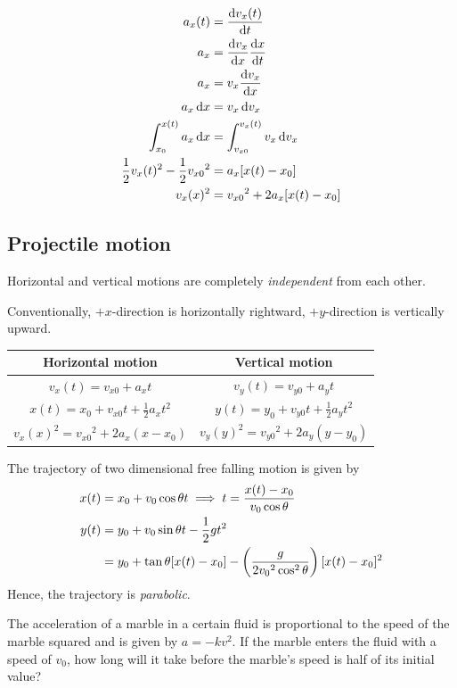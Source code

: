\begin{derivation}
\begin{align*}
a_x(t) &= \odv{v_x(t)}{t} \\
a_x &= \odv{v_x}{x} \odv{x}{t} \\
a_x &= v_x \odv{v_x}{x} \\
a_x \dd{x} &= v_x \dd{v_x} \\
\int_{x_0}^{x(t)}a_x\dd{x} &= \int_{v_{x0}}^{v_x(t)}v_x \dd{v_x} \\
\frac{1}{2}v_x(t)^2 - \frac{1}{2}{v_{x0}}^2 &= a_x[x(t)-x_0] \\
v_x(x)^2 &= {v_{x0}}^2+2a_x[x(t)-x_0] \\
\end{align*}
\end{derivation}

\subsection{Projectile motion}
Horizontal and vertical motions are completely \emph{independent} from each other.

Conventionally, $+x$-direction is horizontally rightward, $+y$-direction is vertically upward.

\begin{table}[H]
\centering
\begin{tabular}{cc}
\hline\hline
\textbf{Horizontal motion} & \textbf{Vertical motion} \\
\hline
$v_x(t)=v_{x0}+a_xt$ & $v_y(t)=v_{y0}+a_yt$ \\
$x(t)=x_0+v_{x0}t+\frac{1}{2}a_xt^2$ & $y(t)=y_0+v_{y0}t+\frac{1}{2}a_yt^2$ \\
$v_x(x)^2={v_{x0}}^2+2a_x(x-x_0)$ & $v_y(y)^2={v_{y0}}^2+2a_y(y-y_0)$ \\
\hline\hline
\end{tabular}
\end{table}

The trajectory of two dimensional free falling motion is given by
\begin{align*}
x(t) &= x_0+v_0\cos\theta t \implies t=\frac{x(t)-x_0}{v_0\cos\theta} \\
y(t) &= y_0+v_0\sin\theta t-\frac{1}{2}gt^2 \\
&= y_0 + \tan\theta[x(t)-x_0]-\left(\frac{g}{2{v_0}^2\cos^2\theta}\right)[x(t)-x_0]^2
\end{align*}
Hence, the trajectory is \emph{parabolic}.
\pagebreak

\begin{exmp}{}{}
The acceleration of a marble in a certain fluid is proportional to the speed of the marble squared and is given by $a=-kv^2$. If the marble enters the fluid with a speed of $v_0$, how long will it take before the marble's speed is half of its initial value?
\end{exmp}

